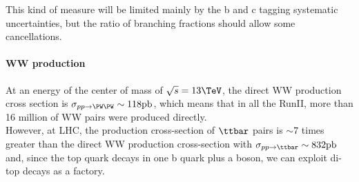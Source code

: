 This kind of measure will be limited mainly by the b and c tagging systematic uncertainties, but the ratio of branching fractions should allow some cancellations.
\paragraph*{WW production}
At an energy of the center of mass of $\sqrt{s}=13 \TeV$, the direct WW production cross section is $\sigma_{pp\to\PW\PW}\sim118 \text{pb}$, which means that in all the RunII, more than 16 million of WW pairs were produced directly.\\
However, at LHC, the production cross-section of $\ttbar$ pairs is $\sim 7$ times greater than the direct WW production cross-section with $\sigma_{pp\to \ttbar}\sim832\text{pb}$ and, since the top quark decays in one b quark plus a \PW boson, we can exploit di-top decays as a \PW\PW factory.
\newpage
